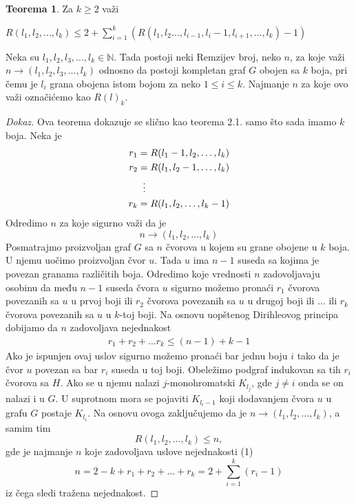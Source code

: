 \documentclass{article}
\theoremstyle{definition}
\newtheorem{teorema}{Teorema}[section]
\newcommand{\dokaz}[1]{\begin{proof}[Dokaz]#1\end{proof}}
\begin{document}
	\begin{teorema}
		Za $k \geq 2$ važi \newline
		
		$ R(l_1, l_2, ... , l_k) \leq 2 + \sum\limits_{i=1}^{k}(R(l_1, l_2 ... , l_{i-1}, l_i-1, l_{i+1}, ... , l_k)-1) $
	\end{teorema}
	
	
	Neka su $l_1, l_2, l_3, ... , l_k \in \mathbb{N}$. Tada postoji neki Remzijev broj, neko $n$, za koje važi $n \rightarrow (l_1, l_2, l_3, ... , l_k)$ odnosno da postoji kompletan graf $G$ obojen sa $k$ boja, pri čemu je $l_i$ grana obojena istom bojom za neko $1 \leq i \leq k$. Najmanje $n$ za koje ovo važi označićemo kao $R(l)_k$. 
	
	\dokaz{
		Ova teorema dokazuje se slično kao teorema 2.1. samo što sada imamo $k$ boja. Neka je
		\begin{align*}
		r_1 &= R(l_1 - 1, l_2, \dots, l_k) \\
		r_2 &= R(l_1, l_2 - 1, \dots, l_k) \\
		&\;\;\vdots \notag \\
		r_k &= R(l_1, l_2, \dots, l_k - 1) \\
		\end{align*}
		Odredimo $n$ za koje sigurno važi da je 
		$$n \rightarrow (l_1, l_2, \dots, l_k)$$
		Posmatrajmo proizvoljan graf $G$ sa $n$ čvorova u kojem su grane obojene u $k$ boja.
		U njemu uočimo proizvoljan čvor $u$. Tada $u$ ima $n - 1$ 
		suseda sa kojima je povezan granama različitih boja. Odredimo koje vrednosti $n$ zadovoljavaju osobinu da među $n - 1$ suseda čvora $u$ sigurno
		možemo pronaći $r_1$ čvorova povezanih sa $u$ u prvoj boji ili $r_2$ čvorova povezanih sa $u$ u drugoj boji ili $\dots$ ili $r_k$ čvorova povezanih sa 		$u$ u $k$-toj boji. Na osnovu uopštenog Dirihleovog principa dobijamo da $n$ zadovoljava nejednakost
		\begin{align} r_1 + r_2 + \dots r_k \leq (n - 1) + k - 1 \end{align}
		Ako je ispunjen ovaj uslov sigurno možemo pronaći bar jednu boju $i$ tako da je čvor $u$ povezan sa bar $r_i$ suseda u toj boji. Obeležimo podgraf
		indukovan sa tih $r_i$ čvorova sa $H$. Ako se u njemu nalazi $j$-monohromatski $K_{l_j}$, gde $j \neq i$ onda se on nalazi i u $G$. U suprotnom mora          
		se pojaviti $K_{l_i - 1}$ koji dodavanjem čvora $u$ u grafu $G$ postaje $K_{l_i}$. Na osnovu ovoga zaključujemo da je 
		$n \rightarrow (l_1, l_2, \dots, l_k)$, a samim tim \newline
		$$R(l_1, l_2, \dots, l_k) \leq n,$$ gde je najmanje $n$ koje zadovoljava uslove nejednakosti (1)
		$$n = 2 - k + r_1 + r_2 + \dots + r_k = 2 + \sum_{i = 1}^{k} (r_i - 1)$$
		iz čega sledi tražena nejednakost.
		
	}
	
\end{document}
